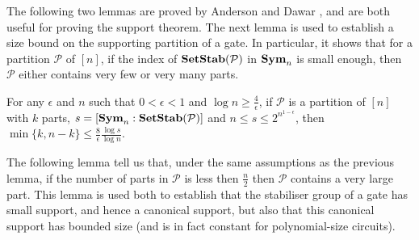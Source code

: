 \documentclass[../paper.tex]{subfiles}
\begin{document}




The following two lemmas are proved by Anderson and Dawar \cite{AndersonD17},
and are both useful for proving the support theorem. The next lemma is used to
establish a size bound on the supporting partition of a gate. In particular, it
shows that for a partition $\mathcal{P}$ of $[n]$, if the index of $\text{\textbf{SetStab}}
(\mathcal{P})$ in $\text{\textbf{Sym}}_n$ is small enough, then $\mathcal{P}$ either contains
very few or very many parts.

\begin{lem}
  \label{lem:big-or-small}
  For any $\epsilon$ and $n$ such that $0 < \epsilon < 1$ and $\log n \geq
  \frac{4}{\epsilon}$, if $\mathcal{P}$ is a partition of $[n]$ with $k$ parts,
  $s = [\text{\textbf{Sym}}_n : \text{\textbf{SetStab}} (\mathcal{P})]$ and $n \leq s \leq
  2^{n^{1-\epsilon}}$, then $\min \{k, n-k\} \leq \frac{8}{\epsilon} \frac{\log
    s}{\log n}$.
\end{lem}

The following lemma tell us that, under the same assumptions as the previous
lemma, if the number of parts in $\mathcal{P}$ is less then $\frac{n}{2}$ then
$\mathcal{P}$ contains a very large part. This lemma is used both to establish
that the stabiliser group of a gate has small support, and hence a canonical
support, but also that this canonical support has bounded size (and is in fact
constant for polynomial-size circuits).
\end{document}
